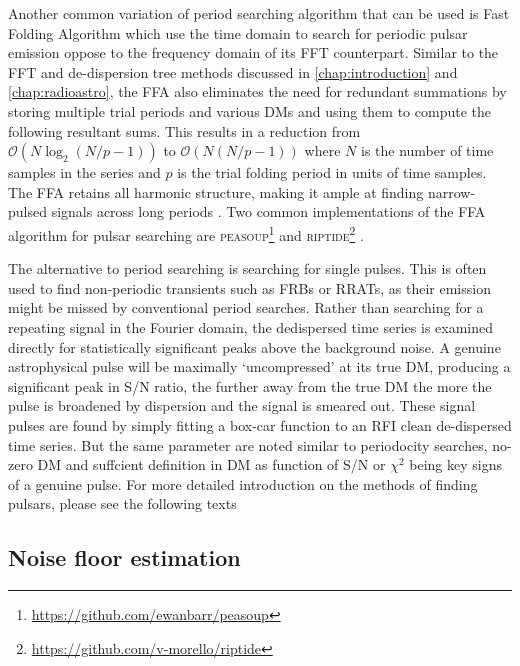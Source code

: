 Another common variation of period searching algorithm that can be used is Fast Folding Algorithm \citep[FFA;][]{staelin_fast_1969} which use the time domain to search for periodic pulsar emission oppose to the frequency domain of its FFT counterpart. Similar to the FFT and de-dispersion tree methods discussed in \cref{chap:introduction} and \cref{chap:radioastro}, the FFA also eliminates the need for redundant summations by storing multiple trial periods and various DMs and using them to compute the following resultant sums. This results in a reduction from $\mathcal{O} (N\log_2(N/p-1))$ to $\mathcal{O}(N(N/p-1))$ where $N$ is the number of time samples in the series and $p$ is the trial folding period in units of time samples. The FFA retains all harmonic structure, making it ample at finding narrow-pulsed signals across long periods \citep[i.e.][]{parent_implementation_2018}. Two common implementations of the FFA algorithm for pulsar searching are \textsc{peasoup}\footnote{\url{https://github.com/ewanbarr/peasoup}} and \textsc{riptide}\footnote{\url{https://github.com/v-morello/riptide}} \citep{morello_optimal_2020}. 

The alternative to period searching is searching for single pulses. This is often used to find non-periodic transients such as FRBs or RRATs, as their emission might be missed by conventional period searches. Rather than searching for a repeating signal in the Fourier domain, the dedispersed time series is examined directly for statistically significant peaks above the background noise. A genuine astrophysical pulse will be maximally `uncompressed' at its true DM, producing a significant peak in S/N ratio, the further away from the true DM the more the pulse is broadened by dispersion and the signal is smeared out. These signal pulses are found by simply fitting a box-car function to an RFI clean de-dispersed time series. But the same parameter are noted similar to periodocity searches, no-zero DM and suffcient definition in DM as function of S/N or $\chi^2$ being key signs of a genuine pulse. For more detailed introduction on the methods of finding pulsars, please see the following texts \cite{folding_picture, pulsar_handbook, ransom_new_2001}

\subsection{Noise floor estimation}

